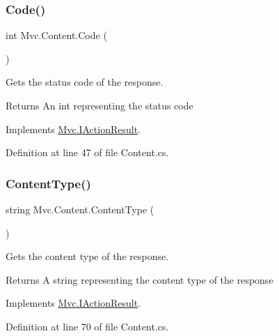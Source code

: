 \subsubsection{\texorpdfstring{Code()}{Code()}}
{\footnotesize\ttfamily int Mvc.\+Content.\+Code (\begin{DoxyParamCaption}{ }\end{DoxyParamCaption})}



Gets the status code of the response. 

\begin{DoxyReturn}{Returns}
An int representing the status code
\end{DoxyReturn}


Implements \hyperlink{interface_mvc_1_1_i_action_result_ab6b85ae50597587395df99b972c3d26b}{Mvc.\+I\+Action\+Result}.



Definition at line 47 of file Content.\+cs.

\mbox{\label{class_mvc_1_1_content_a5d384ef7d466dfc88ccf1eb7f10728ad}} 
\subsubsection{\texorpdfstring{Content\+Type()}{ContentType()}}
{\footnotesize\ttfamily string Mvc.\+Content.\+Content\+Type (\begin{DoxyParamCaption}{ }\end{DoxyParamCaption})}



Gets the content type of the response. 

\begin{DoxyReturn}{Returns}
A string representing the content type of the response
\end{DoxyReturn}


Implements \hyperlink{interface_mvc_1_1_i_action_result_a8ad08f29bba90dfbe06d7a00465af10a}{Mvc.\+I\+Action\+Result}.



Definition at line 70 of file Content.\+cs.

\mbox{\label{class_mvc_1_1_content_ae4eba27dbea637dc61bc4b681f731545}} 
